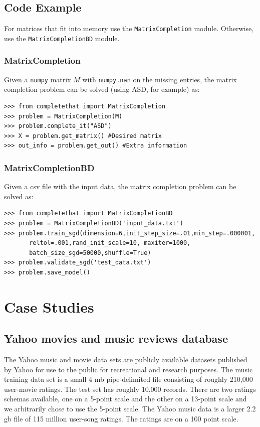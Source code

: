 \documentclass[12pt]{article}
\begin{document}
\subsection*{Code Example}
For matrices that fit into memory use the \texttt{MatrixCompletion} module. Otherwise, use the \texttt{MatrixCompletionBD} module. 

\subsubsection*{MatrixCompletion}
Given a \texttt{numpy} matrix $M$ with \texttt{numpy.nan} on the missing entries, the matrix completion problem can be solved (using ASD, for example) as:
\begin{verbatim}
>>> from completethat import MatrixCompletion
>>> problem = MatrixCompletion(M)
>>> problem.complete_it("ASD")
>>> X = problem.get_matrix() #Desired matrix
>>> out_info = problem.get_out() #Extra information
\end{verbatim}

\subsubsection*{MatrixCompletionBD}
Given a csv file with the input data, the matrix completion problem can be solved as:

\begin{verbatim}
>>> from completethat import MatrixCompletionBD
>>> problem = MatrixCompletionBD('input_data.txt')
>>> problem.train_sgd(dimension=6,init_step_size=.01,min_step=.000001, 
       reltol=.001,rand_init_scale=10, maxiter=1000,
       batch_size_sgd=50000,shuffle=True)
>>> problem.validate_sgd('test_data.txt')
>>> problem.save_model()
\end{verbatim}

\section{Case Studies}
\subsection*{Yahoo movies and music reviews database}
The Yahoo music and movie data sets are publicly available datasets published by Yahoo for use to the public for recreational and research purposes. The music training data set is a small 4 mb pipe-delimited file consisting of roughly 210,000 user-movie ratings. The test set has roughly 10,000 records. There are two ratings schemas available, one on a 5-point scale and the other on a 13-point scale and we arbitrarily chose to use the 5-point scale. The Yahoo music data is a larger 2.2 gb file of 115 million user-song ratings. The ratings are on a 100 point scale.
 
\end{document}
